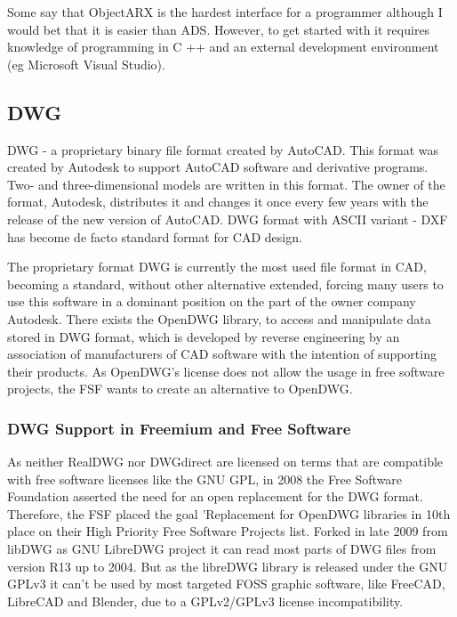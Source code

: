 \documentclass[a4paper, 11pt, article]{report}
\begin{document}
Some say that ObjectARX is the hardest interface for a programmer although I would bet that it is easier than ADS. However, to get started with it requires knowledge of programming in C ++ and an external development environment (eg Microsoft Visual Studio).

\subsection{DWG}
   
DWG - a proprietary binary file format created by AutoCAD.
This format was created by Autodesk to support AutoCAD software and derivative programs. Two- and three-dimensional models are written in this format. The owner of the format, Autodesk, distributes it and changes it once every few years with the release of the new version of AutoCAD.
DWG format with ASCII variant - DXF has become de facto standard format for CAD design.

The proprietary format DWG is currently the most used file format in CAD, becoming a standard, without other alternative extended, forcing many users to use this software in a dominant position on the part of the owner company Autodesk.
There exists the OpenDWG library, to access and manipulate data stored in DWG format, which is developed by reverse engineering by an association of manufacturers of CAD software with the intention of supporting their products. As OpenDWG's license does not allow the usage in free software projects, the FSF wants to create an alternative to OpenDWG.

\subsubsection{DWG Support in Freemium and Free Software}

As neither RealDWG nor DWGdirect are licensed on terms that are compatible with free software licenses like the GNU GPL, in 2008 the Free Software Foundation asserted the need for an open replacement for the DWG format. Therefore, the FSF placed the goal 'Replacement for OpenDWG libraries in 10th place on their High Priority Free Software Projects list. Forked in late 2009 from libDWG as GNU LibreDWG project it can read most parts of DWG files from version R13 up to 2004. But as the libreDWG library is released under the GNU GPLv3 it can't be used by most targeted FOSS graphic software, like FreeCAD, LibreCAD and Blender, due to a GPLv2/GPLv3 license incompatibility. 
\end{document}
